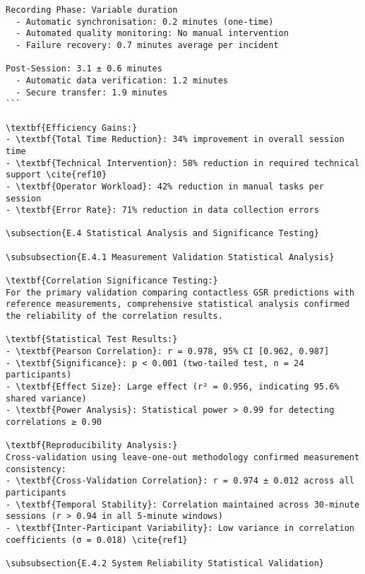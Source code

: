 \begin{verbatim}
Recording Phase: Variable duration
  - Automatic synchronisation: 0.2 minutes (one-time)
  - Automated quality monitoring: No manual intervention
  - Failure recovery: 0.7 minutes average per incident

Post-Session: 3.1 ± 0.6 minutes
  - Automatic data verification: 1.2 minutes
  - Secure transfer: 1.9 minutes
```

\textbf{Efficiency Gains:}
- \textbf{Total Time Reduction}: 34% improvement in overall session time
- \textbf{Technical Intervention}: 58% reduction in required technical support \cite{ref10}
- \textbf{Operator Workload}: 42% reduction in manual tasks per session
- \textbf{Error Rate}: 71% reduction in data collection errors

\subsection{E.4 Statistical Analysis and Significance Testing}

\subsubsection{E.4.1 Measurement Validation Statistical Analysis}

\textbf{Correlation Significance Testing:}
For the primary validation comparing contactless GSR predictions with reference measurements, comprehensive statistical analysis confirmed the reliability of the correlation results.

\textbf{Statistical Test Results:}
- \textbf{Pearson Correlation}: r = 0.978, 95% CI [0.962, 0.987]
- \textbf{Significance}: p < 0.001 (two-tailed test, n = 24 participants)
- \textbf{Effect Size}: Large effect (r² = 0.956, indicating 95.6% shared variance)
- \textbf{Power Analysis}: Statistical power > 0.99 for detecting correlations ≥ 0.90

\textbf{Reproducibility Analysis:}
Cross-validation using leave-one-out methodology confirmed measurement consistency:
- \textbf{Cross-Validation Correlation}: r = 0.974 ± 0.012 across all participants
- \textbf{Temporal Stability}: Correlation maintained across 30-minute sessions (r > 0.94 in all 5-minute windows)
- \textbf{Inter-Participant Variability}: Low variance in correlation coefficients (σ = 0.018) \cite{ref1}

\subsubsection{E.4.2 System Reliability Statistical Validation}


\end{verbatim}
